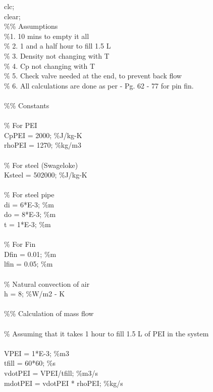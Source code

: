 \begin{appendices}
{\selectfont
clc; \\
clear; \\

\noindent \%\% Assumptions \\

\noindent \%1. 10  mins to empty it all \\
\% 2. 1 and a half hour to fill 1.5 L \\
\% 3. Density not changing with T \\
\% 4. Cp not changing with T \\
\% 5. Check valve needed at the end, to prevent back flow \\
\% 6. All calculations are done as per - Pg. 62 - 77 for pin fin. \\
\\
\%\% Constants \\
\\
\% For PEI \\
CpPEI = 2000; \%J/kg-K \\
rhoPEI = 1270; \%kg/m3 \\
\\
\% For steel (Swageloke) \\
Ksteel = 502000; \%J/kg-K \\
\\
\% For steel pipe \\
di = 6*E-3; \%m  \\
do = 8*E-3; \%m \\
t = 1*E-3; \%m \\
\\
\% For Fin \\
Dfin = 0.01; \%m \\
lfin = 0.05; \%m \\
\\
\% Natural convection of air \\
h = 8; \%W/m2 - K \\
\\
\%\% Calculation of mass flow \\
\\
\% Assuming that it takes 1 hour to fill 1.5 L of PEI in the system \\
\\
VPEI = 1*E-3; \%m3 \\
tfill = 60*60; \%s \\ 
vdotPEI = VPEI/tfill; \%m3/s \\
mdotPEI = vdotPEI * rhoPEI; \%kg/s \\
\\
}
\end{appendices}
